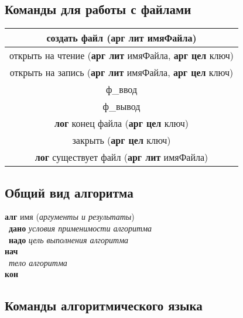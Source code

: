\documentclass[12pt,a4paper]{article}
\newcommand{\otstup}{\textperiodcentered\ }
\begin{document}
\subsection{Команды для работы с файлами}

\begin{center}
\begin{tabular}{||c||}
\hline
\hline
создать файл (\textbf{арг лит} имяФайла)\\
\hline
  открыть на чтение (\textbf{арг лит} имяФайла, \textbf{арг цел} ключ)\\
\hline
  открыть на запись (\textbf{арг лит} имяФайла, \textbf{арг цел} ключ)\\
\hline
  ф\_ввод\\
\hline
  ф\_вывод\\
\hline
  \textbf{лог} конец файла (\textbf{арг цел} ключ)\\
\hline
  закрыть (\textbf{арг цел} ключ)\\
\hline
  \textbf{лог} существует файл (\textbf{арг лит} имяФайла)\\
\hline
\hline
\end{tabular}
\end{center}

\subsection{Общий вид алгоритма}
\sffamily
\textbf{алг} имя (\emph{аргументы и результаты})\\ 
\otstup \textbf{дано} \emph{условия применимости алгоритма}\\
\otstup \textbf{надо} \emph{цель выполнения алгоритма}\\
\textbf{нач}\\
\otstup \emph{тело алгоритма}\\
\textbf{кон}

\subsection{Команды алгоритмического языка}
\end{document}
